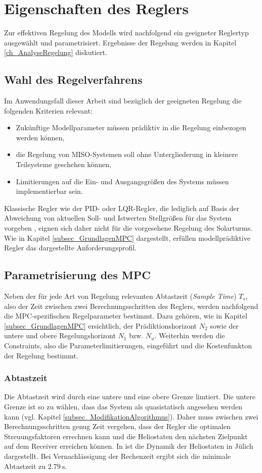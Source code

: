 \section{Eigenschaften des Reglers} \label{sec_Reglereigenschaften}
Zur effektiven Regelung des Modells wird nachfolgend ein geeigneter Reglertyp ausgewählt und parametrisiert.
Ergebnisse der Regelung werden in Kapitel \ref{ch_AnalyseRegelung} diskutiert.


\subsection{Wahl des Regelverfahrens} \label{subsec_ReglerverfahrenWahl}
Im Anwendungsfall dieser Arbeit sind bezüglich der geeigneten Regelung die folgenden Kriterien relevant:
\begin{itemize}
    \item Zukünftige Modellparameter müssen prädiktiv in die Regelung einbezogen werden können,
    \item die Regelung von MISO-Systemen soll ohne Untergliederung in kleinere Teilsysteme geschehen können,
    \item Limitierungen auf die Ein- und Ausgangsgrößen des Systems müssen implementierbar sein.
\end{itemize}
Klassische Regler wie der PID- oder LQR-Regler, die lediglich auf Basis der Abweichung von aktuellen Soll- und Istwerten Stellgrößen für das System vorgeben \cite[S.408]{Lunze}, eignen sich daher nicht für die vorgesehene Regelung des Solarturms.
Wie in Kapitel \ref{subsec_GrundlagenMPC} dargestellt, erfüllen modellprädiktive Regler das dargestellte Anforderungsprofil.


\subsection{Parametrisierung des MPC} \label{subsec_ParameterMPC}
Neben der für jede Art von Regelung relevanten Abtastzeit (\textit{Sample Time}) $T_s$, also der Zeit zwischen zwei Berechnungsschritten des Reglers, werden nachfolgend die MPC-spezifischen Regelparameter bestimmt.
Dazu gehören, wie in Kapitel \ref{subsec_GrundlagenMPC} ersichtlich, der Prädiktionshorizont $N_2$ sowie der untere und obere Regelungshorizont $N_1$ bzw. $N_u$.
Weiterhin werden die Constraints, also die Parameterlimitierungen, eingeführt und die Kostenfunkton der Regelung bestimmt.

\subsubsection*{Abtastzeit} \label{subsubsec_sampletime}
Die Abtastzeit wird durch eine untere und eine obere Grenze limtiert.
Die untere Grenze ist so zu wählen, dass das System als quasistatisch angesehen werden kann (vgl. Kapitel \ref{subsec_ModifikationAlgorithmus}).
Daher muss zwischen zwei Berechnungsschritten genug Zeit vergehen, dass der Regler die optimalen Streuungsfaktoren errechnen kann und die Heliostaten den nächsten Zielpunkt auf dem Receiver erreichen können.
In \cite[S.25-26]{DissZanger} ist die Dynamik der Heliostaten in Jülich dargestellt.
Bei Vernachlässigung der Rechenzeit ergibt sich die minimale Abtastzeit zu $\SI{2.79}{\second}$.

